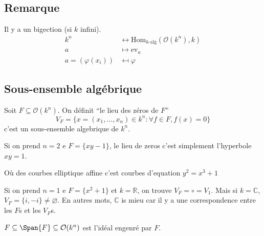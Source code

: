 \subsection{Remarque}

Il y a un bigection (si \(k\) infini).
\begin{align*}{}
    k^{n} &\leftrightarrow \mathrm{Hom}_{k\text{-alg}} {(\mathcal{O}{(k^{n})},
    k)}\\
        a &\mapsto \mathrm{ev}_a \\
        a = {(\varphi {(x_{i})})} &\mapsfrom  \varphi 
\end{align*}

\subsection{Sous-ensemble algébrique}

Soit \(F \subseteq \mathcal{O}{(k^{n})}\). On définit ``le lieu des zéros de \(F\)''
\[
  V_F = \{x = {(x_{1}, \dots, x_{n})} \in k^{n} : \forall f \in F, f{(x)} = 0\} 
\]
c'est un sous-ensemble algebrique de \(k^{n}\).

\begin{example}{}
    Si on prend \(n=2\) e \(F = \{xy - 1\}\), le lieu de zeros c'est simplement
    l'hyperbole \(xy = 1\).
    \begin{figure}[ht]
        \centering
    \end{figure}
    Où des courbes elliptique affine c'est courbes d'equation \(y^2 = x^3 + 1\) 
\end{example}

Si on prend \(n=1\) e \(F = \{x^2 + 1\} \) et \(k = \mathbb{R}\), on trouve
\(V_F = \circ = V_{1} \). Mais si \(k = \mathbb{C}\), \(V_F = \{i, -i\} \neq
\varnothing\). En autres mots, \(\mathbb{C}\) is mieu car il y a une
correspondence entre les \(F\)s et les \(V_F\)s.

\begin{note}[zione]
    \(F \subseteq  \Span{F} \subseteq \mathcal{O}{(k^{n})} \) est l'idéal
    engenré par \(F\).
\end{note}

